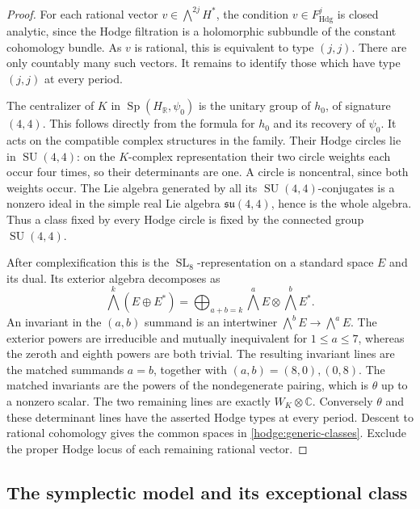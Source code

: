 \documentclass[11pt]{article}
\theoremstyle{definition}
\theoremstyle{remark}
\numberwithin{equation}{section}
\begin{document}
\begin{proof}
For each rational vector $v\in\bigwedge^{2j}H^*$, the condition
$v\in F^j_{\mathrm{Hdg}}$ is closed analytic, since the Hodge filtration
is a holomorphic subbundle of the constant cohomology bundle.
As $v$ is rational, this is equivalent to type $(j,j)$.
There are only countably many such vectors.  It remains to identify those
which have type $(j,j)$ at every period.

The centralizer of $K$ in $\operatorname{Sp}(H_\mathbb R,\psi_0)$ is the unitary group of
$h_0$, of signature $(4,4)$.  This follows directly from the formula for
$h_0$ and its recovery of $\psi_0$.  It acts on the compatible complex
structures in the family.  Their Hodge circles lie in $\operatorname{SU}(4,4)$:
on the $K$-complex representation their two circle weights each occur
four times, so their determinants are one.  A circle is noncentral,
since both weights occur.  The Lie algebra generated by all its
$\operatorname{SU}(4,4)$-conjugates is a nonzero ideal in the simple real Lie algebra
$\mathfrak{su}(4,4)$, hence is the whole algebra.  Thus a class fixed
by every Hodge circle is fixed by the connected group $\operatorname{SU}(4,4)$.

After complexification this is the $\operatorname{SL}_8$-representation on a standard
space $E$ and its dual.  Its exterior algebra decomposes as
\[
 \bigwedge^k(E\oplus E^*)=
 \bigoplus_{a+b=k}\bigwedge^aE\otimes\bigwedge^bE^*.
\]
An invariant in the $(a,b)$ summand is an intertwiner
$\bigwedge^bE\to\bigwedge^aE$.  The exterior powers are irreducible
and mutually inequivalent for $1\le a\le7$, whereas the zeroth and
eighth powers are both trivial.  The resulting invariant lines are the
matched summands $a=b$, together with $(a,b)=(8,0),(0,8)$.
The matched invariants are the powers of the nondegenerate pairing,
which is $\theta$ up to a nonzero scalar.  The two remaining lines are
exactly $W_K\otimes\mathbb C$.  Conversely $\theta$ and these determinant
lines have the asserted Hodge types at every period.  Descent to rational
cohomology gives the common spaces in \eqref{hodge:generic-classes}.
Exclude the proper Hodge locus of each remaining rational vector.
\end{proof}

\subsection{The symplectic model and its exceptional class}
\end{document}
